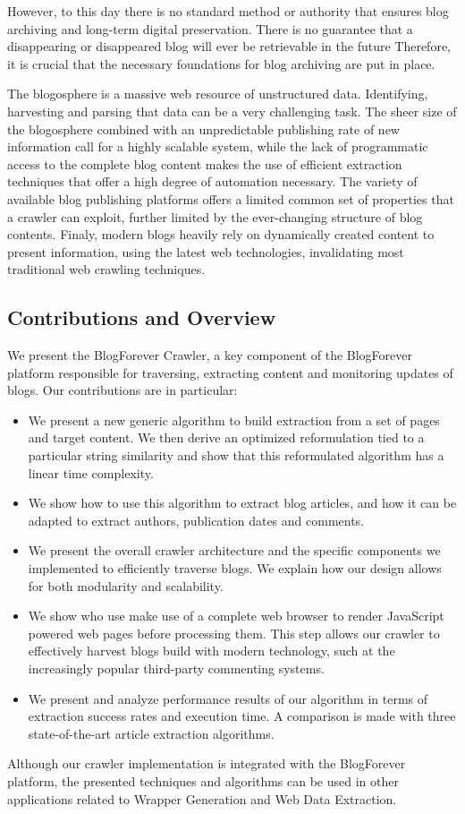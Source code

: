 However, to this day there is no standard method or authority that ensures blog archiving and long-term digital preservation. There is no guarantee that a disappearing or disappeared blog will ever be retrievable in the future \cite{anderson2012} Therefore, it is crucial that the necessary foundations for blog archiving are put in place.

The blogosphere is a massive web resource of unstructured data. Identifying, harvesting and parsing that data can be a very challenging task. The sheer size of the blogosphere combined with an unpredictable publishing rate of new information call for a highly scalable system, while the lack of programmatic access to the complete blog content makes the use of efficient extraction techniques that offer a high degree of automation necessary. The variety of available blog publishing platforms offers a limited common set of properties that a crawler can exploit, further limited by the ever-changing structure of blog contents. Finaly, modern blogs heavily rely on dynamically created content to present information, using the latest web technologies, invalidating most traditional web crawling techniques.

\subsection{Contributions and Overview}
We present the BlogForever Crawler, a key component of the BlogForever platform responsible for traversing, extracting content and monitoring updates of blogs.
Our contributions are in particular:

\begin{itemize}
  \item We present a new generic algorithm to build extraction from a set of pages and target content. We then derive an optimized reformulation tied to a particular string similarity and show that this reformulated algorithm has a linear time complexity.
  \item We show how to use this algorithm to extract blog articles, and how it can be adapted to extract authors, publication dates and comments.
  \item We present the overall crawler architecture and the specific components we implemented to efficiently traverse blogs. We explain how our design allows for both modularity and scalability.
  \item We show who use make use of a complete web browser to render JavaScript powered web pages before processing them. This step allows our crawler to effectively harvest blogs build with modern technology, such at the increasingly popular third-party commenting systems.
  \item We present and analyze performance results of our algorithm in terms of extraction success rates and execution time. A comparison is made with three state-of-the-art article extraction algorithms.
\end{itemize}

Although our crawler implementation is integrated with the BlogForever platform, the presented techniques and algorithms can be used in other applications related to Wrapper Generation and Web Data Extraction.
